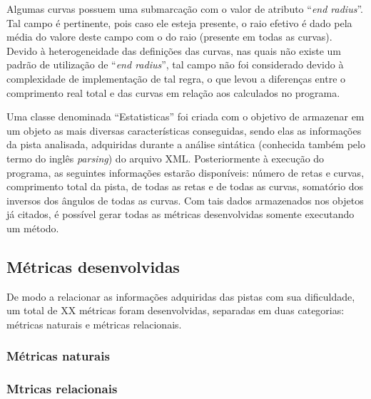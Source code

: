\documentclass[conference]{IEEEtran}
\begin{document}
  	Algumas curvas possuem uma submarcação com o valor de atributo ``\textit{end radius}''. Tal campo é pertinente, pois caso ele esteja presente, o raio efetivo é dado pela média do valore deste campo com o do raio (presente em todas as curvas). Devido à heterogeneidade das definições das curvas, nas quais não existe um padrão de utilização de ``\textit{end radius}'', tal campo não foi considerado devido à complexidade de implementação de tal regra, o que levou a diferenças entre o comprimento real total e das curvas em relação aos calculados no programa.	

  	Uma classe denominada ``Estatisticas'' foi criada com o objetivo de armazenar em um objeto as mais diversas características conseguidas, sendo elas as informações da pista analisada, adquiridas durante a análise sintática (conhecida também pelo termo do inglês \textit{parsing}) do arquivo XML. Posteriormente à execução do programa, as seguintes informações estarão disponíveis: número de retas e curvas, comprimento total da pista, de todas as retas e de todas as curvas, somatório dos inversos dos ângulos de todas as curvas. Com tais dados armazenados nos objetos já citados, é possível gerar todas as métricas desenvolvidas somente executando um método.
  
\subsection{Métricas desenvolvidas}
	De modo a relacionar as informações adquiridas das pistas com sua dificuldade, um total de XX métricas foram desenvolvidas, separadas em duas categorias: métricas naturais e métricas relacionais.

\subsubsection{Métricas naturais}

\subsubsection{Mtricas relacionais}   



%
%
\end{document}
